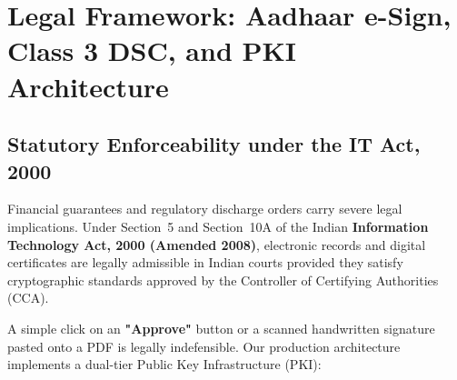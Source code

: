 \documentclass[12pt, a4paper]{report}
\begin{document}
\chapter{Legal Framework: Aadhaar e-Sign, Class 3 DSC, and PKI Architecture}

\section{Statutory Enforceability under the IT Act, 2000}

Financial guarantees and regulatory discharge orders carry severe legal implications. Under Section~5 and Section~10A of the Indian \textbf{Information Technology Act, 2000 (Amended 2008)}, electronic records and digital certificates are legally admissible in Indian courts provided they satisfy cryptographic standards approved by the Controller of Certifying Authorities (CCA).

A simple click on an \textbf{"Approve"} button or a scanned handwritten signature pasted onto a PDF is legally indefensible. Our production architecture implements a dual-tier Public Key Infrastructure (PKI):
\end{document}
